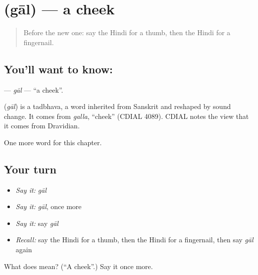 \section[\texorpdfstring{\hi{गाल} (gāl)}{गाल (gāl)}]{ (gāl) — a cheek}

\label{lesson:HI-C150-gal}



\begin{quote}
Before the new one: say the Hindi for a thumb, then the Hindi for a fingernail.
\end{quote}

\subsection*{You'll want to know: }
\textbf{} — \emph{gāl} — \textquotedblleft{}a cheek\textquotedblright{}.

\begin{cousinweb}
\textbf{} (\emph{gāl}) is a tadbhava, a word inherited from Sanskrit and reshaped by sound change. It comes from \emph{galla}, \textquotedblleft{}cheek\textquotedblright{} (CDIAL 4089). CDIAL notes the view that it comes from Dravidian.
\end{cousinweb}

\begin{grammarlens}[title={What you've built}]
One more word for this chapter.
\end{grammarlens}

\subsection*{Your turn}
\begin{itemize}
\raggedright
  \item \emph{Say it:} \emph{gāl}
  \item \emph{Say it:} \emph{gāl}, once more
  \item \emph{Say it:} say \emph{gāl}
  \item \emph{Recall:} say the Hindi for a thumb, then the Hindi for a fingernail, then say \emph{gāl} again
\end{itemize}

\begin{tcolorbox}[breakable,colback=teal!4,colframe=teal!35!black,title={Before you move on}]
What does  mean? (\textquotedblleft{}A cheek\textquotedblright{}.) Say it once more.
\end{tcolorbox}
